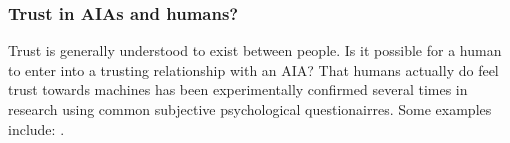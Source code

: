     \subsubsection{Trust in AIAs and humans?}
        Trust is generally understood to exist between people. Is it possible for a human to enter into a trusting relationship with an AIA?
        That humans actually do feel trust towards machines has been experimentally confirmed several times in research using common subjective psychological questionairres. Some examples include: \citet{Muir1996-gt,Reeves1997-ad,Groom2007-bz,Mcknight2011-gv,Riley1996-qm,Bainbridge2011-pl,Kaniarasu2012-mo,Salem2015-md,Desai2012-rc, Freedy2007-sg, Wang2016-id, Inagaki1998-cl, Kaniarasu2013-ho}.


